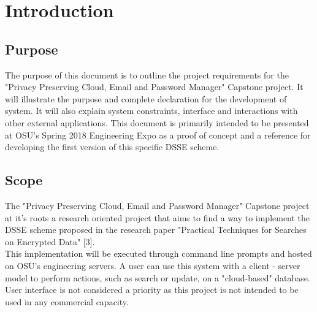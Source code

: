 \documentclass[onecolumn, draftclsnofoot,10pt, compsoc]{IEEEtran}
\begin{document}
        
      
\section{ Introduction }
\subsection{ Purpose }
The purpose of this document is to outline the project requirements for the "Privacy Preserving Cloud, Email and Password Manager" Capstone project. It will illustrate the purpose and complete declaration for the development of system. It will also explain system constraints, interface and interactions with other external applications. This document is primarily intended to be presented at OSU's Spring 2018 Engineering Expo as a proof of concept and a reference for developing the first version of this specific DSSE scheme.
\subsection{ Scope }
The "Privacy Preserving Cloud, Email and Password Manager" Capstone project at it's roots a research oriented project that aims to find a way to implement the DSSE scheme proposed in the research paper "Practical Techniques for Searches on Encrypted Data" [3].\\
This implementation will be executed through command line prompts and hosted on OSU's engineering servers. A user can use this system with a client - server model to perform actions, such as search or update, on a "cloud-based" database. User interface is not considered a priority as this project is not intended to be used in any commercial capacity. 
\end{document}
